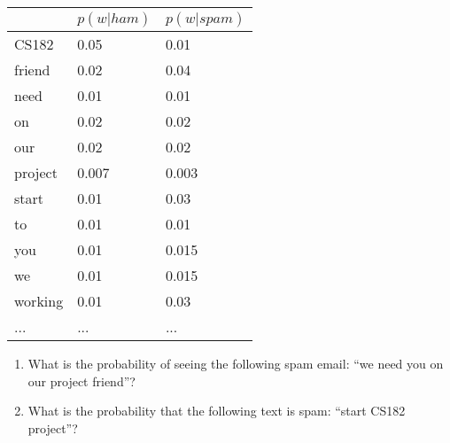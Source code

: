 \documentclass[11pt]{article}
\newif\ifsol
\begin{document}
\begin{enumerate}
\begin{table}[h!]
\centering
\begin{tabular}{@{}lll@{}}
\toprule
        & $p(w|ham)$ & $p(w|spam)$ \\ \midrule
CS182   & 0.05     & 0.01      \\
friend  & 0.02     & 0.04      \\
need    & 0.01     & 0.01      \\
on      & 0.02     & 0.02      \\
our     & 0.02     & 0.02      \\
project & 0.007    & 0.003     \\
start   & 0.01     & 0.03       \\
to      & 0.01     & 0.01      \\
you     & 0.01     & 0.015     \\
we      & 0.01     & 0.015     \\
working & 0.01     & 0.03      \\
...     & ...      & ...      \\ \bottomrule
\end{tabular}
\end{table}

\begin{enumerate}
\item
What is the probability of seeing the following spam email: ``we need you on our project friend''?\\
\ifsol
\textcolor{blue}{\[
p(email|spam) = 0.015*0.01*0.015*0.02*0.003*0.04 = 5.4 *10^{-12}
\]}
\else
    \vspace{1cm}
\fi

\item
What is the probability that the following text is spam: ``start CS182 project''?\\
\ifsol
\textcolor{blue}{\begin{align*}
p(email|ham) &= 0.01 * 0.05 * 0.007 = 0.0000035 \\
p(email|spam) &= 0.03 * 0.01 * 0.003 = 0.0000009\\
p(spam|email) &\propto 0.5 * 0.0000009\\
p(ham|email) &\propto 0.5 * 0.0000035%
\end{align*}
We can normalize this and get a probability for $p(spam|email) = 0.205$.
}
\else
    \vspace{1cm}
\fi



\end{enumerate}
\end{enumerate}
\end{document}
